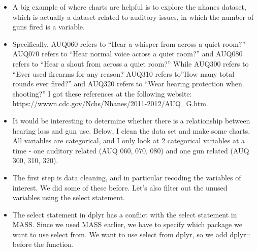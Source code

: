 \documentclass[
  letterpaper,
  DIV=11,
  numbers=noendperiod]{scrreprt}
\providecommand{\tightlist}{%
  \setlength{\itemsep}{0pt}\setlength{\parskip}{0pt}}\usepackage{longtable,booktabs,array}
\begin{document}
\begin{itemize}
\tightlist
\item
  A big example of where charts are helpful is to explore the nhanes
  dataset, which is actually a dataset related to auditory issues, in
  which the number of guns fired is a variable.
\item
  Specifically, AUQ060 refers to ``Hear a whisper from across a quiet
  room?'' AUQ070 refers to ``Hear normal voice across a quiet room?''
  and AUQ080 refers to ``Hear a shout from across a quiet room?'' While
  AUQ300 refers to ``Ever used firearms for any reason? AUQ310 refers
  to''How many total rounds ever fired?'' and AUQ320 refers to ``Wear
  hearing protection when shooting?'' I got these references at the
  following website:
  https://wwwn.cdc.gov/Nchs/Nhanes/2011-2012/AUQ\_G.htm.
\item
  It would be interesting to determine whether there is a relationship
  between hearing loss and gun use. Below, I clean the data set and make
  some charts. All variables are categorical, and I only look at 2
  categorical variables at a time - one auditory related (AUQ 060, 070,
  080) and one gun related (AUQ 300, 310, 320).
\item
  The first step is data cleaning, and in particular recoding the
  variables of interest. We did some of these before. Let's also filter
  out the unused variables using the select statement.\\
\item
  The select statement in dplyr has a conflict with the select statement
  in MASS. Since we used MASS earlier, we have to specify which package
  we want to use select from. We want to use select from dplyr, so we
  add dplyr:: before the function.
\end{itemize}
\end{document}
